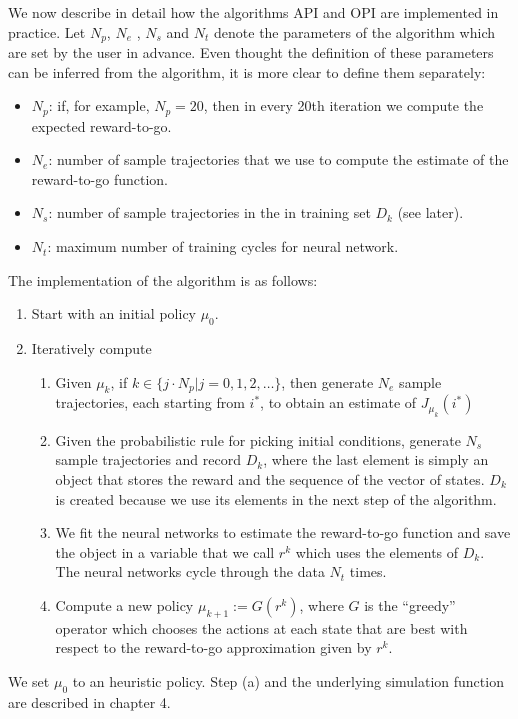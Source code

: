 \documentclass[11pt, oneside]{article}   	%
\begin{document}
We now describe in detail how the algorithms API and OPI are implemented in practice. Let $N_{p}$, $N_{e}$ , $N_{s}$ and $N_{t}$ denote the parameters of the algorithm which are set by the user in advance. Even thought the definition of these parameters can be inferred from the algorithm, it is more clear to define them separately:
\begin{itemize}
    \item $N_{p}$: if, for example, $N_{p}=20$, then in every 20th iteration we compute the expected reward-to-go.
    \item $N_{e}$: number of sample trajectories that we use to compute the estimate of the reward-to-go function.
    \item $N_{s}$: number of sample trajectories in the in training set $D_{k}$ (see later).
    \item $N_{t}$: maximum number of training cycles for neural network.
\end{itemize}
The implementation of the algorithm is as follows:
\begin{enumerate}
    \item Start with an initial policy $\mu_{0}$.
    \item Iteratively compute
    \begin{enumerate}
    \item Given $\mu_{k}$, if $k \in \{j \cdot N_{p} | j=0,1,2,…\}$, then generate $N_{e}$ sample trajectories, each starting from $i^{*}$, to obtain an estimate of $J_{\mu_{k}}(i^{*})$
    \item Given the probabilistic rule for picking initial conditions, generate $N_{s}$ sample trajectories and record $D_{k}$, where the last element is simply an object that stores the reward and the sequence of the vector of states. $D_{k}$ is created because we use its elements in the next step of the algorithm.
    \item We fit the neural networks to estimate the reward-to-go function and save the object in a variable that we call $r^{k}$ which uses the elements of $D_{k}$. The neural networks cycle through the data $N_{t}$ times.
    \item Compute a new policy $\mu_{k+1} := G(r^{k})$, where $G$ is the “greedy” operator which chooses the actions at each state that are best with respect to the reward-to-go approximation given by $r^{k}$.
    \end{enumerate}
\end{enumerate}
We set $\mu_{0}$ to an heuristic policy. Step (a) and the underlying simulation function are described in chapter 4.
\end{document}
